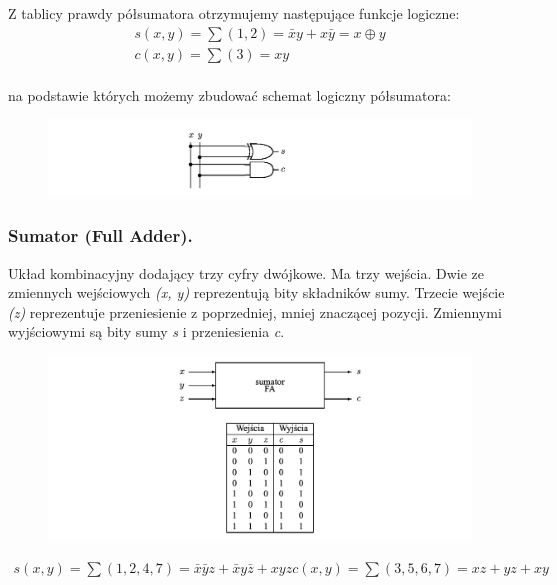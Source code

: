 \documentclass[12pt]{article}
\begin{document}
    Z tablicy prawdy półsumatora otrzymujemy następujące funkcje logiczne:
    \begin{gather*}
        s(x,y) = \sum (1,2) = \bar{x}y + x\bar{y} = x \oplus y\\
        c(x,y) = \sum (3) = xy\\
    \end{gather*}

    na podstawie których możemy zbudować schemat logiczny półsumatora:

    \begin{figure}[H]
        \includegraphics[width=\linewidth]{uk/ha_l.png}
    \end{figure}

    \subsubsection{Sumator (Full Adder).}
    Układ kombinacyjny dodający trzy cyfry dwójkowe. Ma trzy wejścia. Dwie ze zmiennych wejściowych \textit{(x, y)}
    reprezentują bity składników sumy. Trzecie wejście \textit{(z)} reprezentuje przeniesienie z poprzedniej, mniej
    znaczącej pozycji. Zmiennymi wyjściowymi są bity sumy \textit{s} i przeniesienia \textit{c}.

    \begin{figure}[H]
        \includegraphics[width=\linewidth]{uk/fa.png}
    \end{figure}

    \begin{gather*}
        s(x,y) = \sum (1,2,4,7) = \bar{x}\bar{y}z + \bar{x}y\bar{z} + xyz
        c(x,y) = \sum (3,5,6,7) = xz + yz + xy\\
    \end{gather*}
\end{document}
